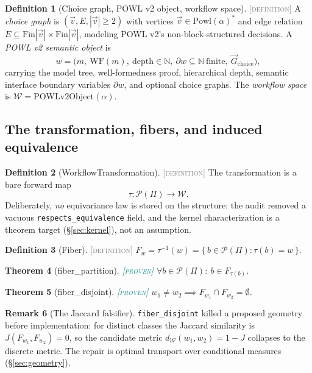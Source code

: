 \documentclass[11pt]{article}
\newcommand{\PROVEN}{\textcolor{teal}{\textsc{[proven]}}}
\newcommand{\DEFINITION}{\textcolor{gray}{\textsc{[definition]}}}
\newcommand{\PT}{\Pi}                          %
\newcommand{\PS}{\mathcal{P}(\PT)}             %
\newcommand{\WS}{\mathcal{W}}                  %
\newcommand{\tmap}{\tau}                       %
\newcommand{\fib}[1]{F_{#1}}                   %
\newcommand{\dW}{d_{\mathcal{W}}}
\newcommand{\N}{\mathbb{N}}
\theoremstyle{plain}
\newtheorem{theorem}{Theorem}[section]
\theoremstyle{definition}
\newtheorem{definition}[theorem]{Definition}
\newtheorem{remark}[theorem]{Remark}
\begin{document}
\begin{definition}[Choice graph, POWL v2 object, workflow space]\DEFINITION\;
A \emph{choice graph} is $(\vec{v}, E, |\vec{v}| \ge 2)$ with vertices
$\vec{v} \in \mathrm{Powl}(\alpha)^{*}$ and edge relation
$E \subseteq \mathrm{Fin}|\vec{v}| \times \mathrm{Fin}|\vec{v}|$, modeling
POWL v2's non-block-structured decisions. A \emph{POWL v2 semantic object} is
\[
  w = \big(m,\ \mathrm{WF}(m),\ \mathrm{depth} \in \N,\
           \partial w \subseteq \N\ \text{finite},\
           \vec{G}_{\mathrm{choice}}\big),
\]
carrying the model tree, well-formedness proof, hierarchical depth, semantic
interface boundary variables $\partial w$, and optional choice graphs. The
\emph{workflow space} is $\WS = \mathrm{POWLv2Object}(\alpha)$.
\end{definition}

\subsection{The transformation, fibers, and induced equivalence}

\begin{definition}[WorkflowTransformation]\DEFINITION\;
The transformation is a bare forward map
\[
  \tmap : \PS \to \WS .
\]
Deliberately, \emph{no} equivariance law is stored on the structure: the
audit removed a vacuous \texttt{respects\_equivalence} field, and the kernel
characterization is a theorem target (\S\ref{sec:kernel}), not an assumption.
\end{definition}

\begin{definition}[Fiber]\DEFINITION\;
$\fib{w} = \tmap^{-1}(w) = \{\, b \in \PS : \tmap(b) = w \,\}$.
\end{definition}

\begin{theorem}[fiber\_partition]\PROVEN\;
$\forall b \in \PS:\ b \in \fib{\tmap(b)}$.
\end{theorem}

\begin{theorem}[fiber\_disjoint]\PROVEN\;
$w_1 \ne w_2 \implies \fib{w_1} \cap \fib{w_2} = \emptyset$.
\end{theorem}

\begin{remark}[The Jaccard falsifier]
\texttt{fiber\_disjoint} killed a proposed geometry before implementation:
for distinct classes the Jaccard similarity is
$J(\fib{w_1}, \fib{w_2}) = 0$, so the candidate metric
$\dW(w_1,w_2) = 1 - J$ collapses to the discrete metric. The repair is
optimal transport over conditional measures (\S\ref{sec:geometry}).
\end{remark}
\end{document}
